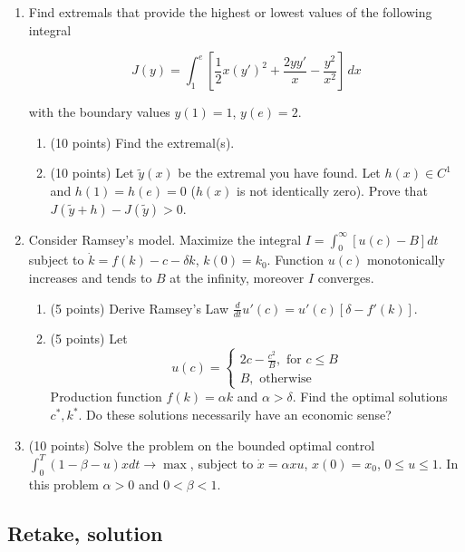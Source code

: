 \documentclass[12pt, a4paper]{article}
\begin{document}
\begin{enumerate}[resume]

\item	Find extremals that provide the highest or lowest values of the following integral

\[
J(y)=\int _{1}^{e} \left[ \frac{1}{2} x(y')^{2} +\frac{2yy'}{x} -\frac{y^{2} }{x^{2} } \right] \, dx
\]

with the boundary values $y(1)=1$, $y(e)=2$.

\begin{enumerate}
\item (10 points) Find the extremal(s).

\item (10 points) Let $\tilde{y}(x)$ be the extremal you have found. Let  $h(x)\in C^{1} $ and $h(1)=h(e)=0$ ($h(x)$ is not identically zero). Prove that $J(\tilde{y}+h)-J(\tilde{y})>0$.
\end{enumerate}

\item Consider Ramsey's model. Maximize the integral $I=\int _{0}^{\infty }[u(c)-B]dt $ subject to $\dot{k}=f(k)-c-\delta k$, $k(0)=k_{0}$. Function $u(c)$ monotonically increases and tends to $B$ at the infinity, moreover $I$ converges.

\begin{enumerate}
\item (5 points) Derive Ramsey's Law $\frac{d}{dt} u'(c)=u'(c)[\delta -f'(k)]$.

\item (5 points) Let
\[
u(c) =
\begin{cases}
2c - \frac{c^2}{B}, \text{ for } c \leq B \\
B, \text{ otherwise }
\end{cases}
\]
Production function $f(k)=\alpha k$ and $\alpha >\delta $. Find the optimal solutions $c^*,k^*$. Do these solutions necessarily have an economic sense?
\end{enumerate}



\item (10 points) Solve the problem on the bounded optimal control $\int _{0}^{T}(1-\beta -u)xdt \to \max$, subject to $\dot{x}=\alpha xu$, $x(0)=x_{0}$, $0\le u\le 1$. In this problem $\alpha>0$ and $0<\beta <1$.

\end{enumerate}

\subsection{Retake, solution}
\end{document}
